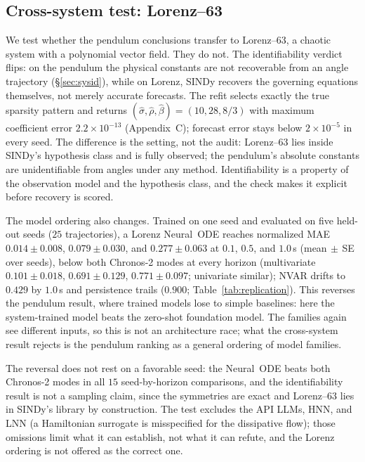 \documentclass{article}
\begin{document}
\subsection{Cross-system test: Lorenz--63}
\label{sec:lorenz}
We test whether the pendulum conclusions transfer to Lorenz--63, a chaotic system with a
polynomial vector field. They do not. The identifiability verdict flips: on the pendulum the
physical constants are not recoverable from an angle trajectory (\S\ref{sec:sysid}), while on
Lorenz, SINDy recovers the governing equations themselves, not merely accurate forecasts. The
refit selects exactly the true sparsity pattern and returns
$(\hat\sigma,\hat\rho,\hat\beta)=(10,28,8/3)$ with maximum coefficient error $2.2\times10^{-13}$
(Appendix~C); forecast error stays below $2\times10^{-5}$ in every seed. The difference is
the setting, not the audit: Lorenz--63 lies inside SINDy's hypothesis class and is fully
observed; the pendulum's absolute constants are unidentifiable from angles under any method.
Identifiability is a property of the observation model and the hypothesis class, and the
check makes it explicit before recovery is scored.

The model ordering also changes. Trained on one seed and evaluated on five held-out seeds
($25$ trajectories), a Lorenz Neural~ODE reaches normalized MAE $0.014\pm0.008$, $0.079\pm0.030$,
and $0.277\pm0.063$ at $0.1$, $0.5$, and $1.0$\,s (mean$\,\pm\,$SE over seeds), below both
Chronos-2 modes at every horizon (multivariate $0.101\pm0.018$,
$0.691\pm0.129$, $0.771\pm0.097$; univariate similar); NVAR drifts to $0.429$ by $1.0$\,s and
persistence trails ($0.900$; Table~\ref{tab:replication}). This reverses the pendulum result, where trained models lose to
simple baselines: here the system-trained model beats the zero-shot foundation model. The
families again see different inputs, so this is not an architecture race; what the
cross-system result rejects is the pendulum ranking as a general ordering of model families.

The reversal does not rest on a favorable seed: the Neural~ODE beats both Chronos-2 modes in
all $15$ seed-by-horizon comparisons, and the identifiability result is not a sampling
claim, since the symmetries are exact and Lorenz--63 lies in SINDy's library by construction.
The test excludes the API LLMs, HNN, and LNN (a Hamiltonian surrogate is misspecified for the
dissipative flow); those omissions limit what it can establish, not what it can refute, and
the Lorenz ordering is not offered as the correct one.
\end{document}
